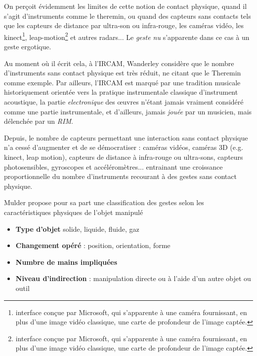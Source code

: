 
On perçoit évidemment les limites de cette notion de contact physique, quand il s'agit d'instruments comme le theremin, ou quand des capteurs sans contacts tels que les capteurs de distance par ultra-son ou infra-rouge, les caméras vidéo, les kinect\footnote{interface conçue par Microsoft, qui s'apparente à une caméra fournissant, en plus d'une image vidéo classique, une carte de profondeur de l'image captée.}, leap-motion\footnote{interface conçue par Microsoft, qui s'apparente à une caméra fournissant, en plus d'une image vidéo classique, une carte de profondeur de l'image captée.} et autres radars... Le \textit{geste nu} s'apparente dans ce cas à un geste ergotique.

Au moment où il écrit cela, à l'IRCAM, Wanderley considère que le nombre d'instruments sans contact physique est très réduit, ne citant que le Theremin comme exemple. Par ailleurs, l'IRCAM est marqué par une tradition musicale historiquement orientée vers la pratique instrumentale classique d'instrument acoustique, la partie \textit{electronique} des œuvres n'étant jamais vraiment considéré comme une partie instrumentale, et d'ailleurs, jamais \textit{jouée} par un musicien, mais délenchée par un \textit{\gls{RIM}}.


Depuis, le nombre de capteurs permettant une interaction sans contact physique n'a cessé d'augmenter et de se démocratiser : caméras vidéos, caméras 3D (e.g. kinect, leap motion), capteurs de distance à infra-rouge ou ultra-sons, capteurs photosensibles, gyroscopes et accéléromètres... entrainant une croissance proportionnelle du nombre d'instruments recourant à des gestes sans contact physique.


Mulder \cite{mulder_mulder_2000} propose pour sa part une classification des gestes selon les caractéristiques physiques de l'objet manipulé
\vspace{-1em}
\begin{itemize}[noitemsep]
\item \textbf{Type d'objet} solide, liquide, fluide, gaz
\item \textbf{Changement opéré} : position, orientation, forme
\item \textbf{Numbre de mains impliquées}
\item \textbf{Niveau d'indirection} : manipulation directe ou à l'aide d'un autre objet ou outil
\end{itemize}


